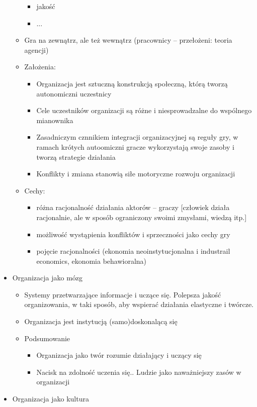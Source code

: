 \documentclass[a4paper,10pt]{report}
\begin{document}
\begin{itemize}
\begin{itemize}
\begin{itemize}
			\item jakość
			\item ...
		\end{itemize}
		\item Gra na zewnątrz, ale też wewnątrz (pracownicy -- przełożeni: teoria agencji)
		\item Założenia:
		\begin{itemize}
			\item Organizacja jest sztuczną konstrukcją społeczną, którą tworzą autonomiczni uczestnicy
			\item Cele uczestników organizacji są różne i niesprowadzalne do wspólnego mianownika
			\item Zasadniczym cznnikiem integracji organizacyjnej są reguły gry, w ramach krótych autoomiczni gracze wykorzystają swoje zasoby i tworzą strategie działania
			\item Konflikty i zmiana stanowią siłe motoryczne rozwoju organizacji
		\end{itemize}
		\item Cechy:
		\begin{itemize}
			\item różna racjonalność działania aktorów -- graczy [człowiek działa racjonalnie, ale w sposób ograniczony swoimi zmysłami, wiedzą itp.]
			\item możliwość wystąpienia konfliktów i sprzeczności jako cechy gry
			\item pojęcie racjonalności (ekonomia neoinstytucjonalna i industrail economics, ekonomia behawioralna) 
		\end{itemize}
	\end{itemize}
	\item Organizacja jako mózg
	\begin{itemize}
		\item Systemy przetwarzające informacje i uczące się. Polepsza jakość organizowania, w taki sposób, aby wspierać działania elastyczne i twórcze.
		\item Organizacja jest instytucją (samo)doskonalącą się		
		\item Podsumowanie
		\begin{itemize}
			\item Organizacja jako twór rozumie działający i uczący się
			\item Nacisk na zdolność uczenia się.. Ludzie jako naważniejszy zasów w organizacji
		\end{itemize}
	\end{itemize}
	\item Organizacja jako kultura

\end{itemize}
\end{document}
